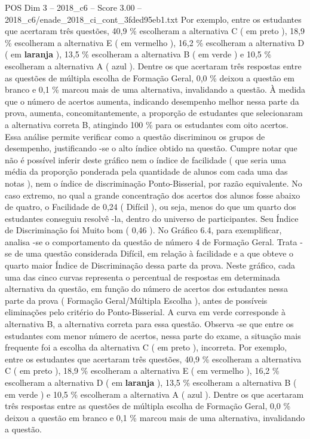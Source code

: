 \begin{textsample}{POS Dim 3 – 2018\_c6 – Score 3.00 – 2018\_c6/enade\_2018\_ci\_cont\_3fded95eb1.txt}
Por exemplo, entre os estudantes que acertaram três questões, 40,9 \% escolheram a alternativa C ( em preto ), 18,9 \% escolheram a alternativa E ( em vermelho ), 16,2 \% escolheram a alternativa D ( em \textbf{laranja} ), 13,5 \% escolheram a alternativa B ( em verde ) e 10,5 \% escolheram a alternativa A ( azul ).
Dentre os que acertaram três respostas entre as questões de múltipla escolha de Formação Geral, 0,0 \% deixou a questão em branco e 0,1 \% marcou mais de uma alternativa, invalidando a questão.
À medida que o número de acertos aumenta, indicando desempenho melhor nessa parte da prova, aumenta, concomitantemente, a proporção de estudantes que selecionaram a alternativa correta B, atingindo 100 \% para os estudantes com oito acertos.
Essa análise permite verificar como a questão discriminou os grupos de desempenho, justificando -se o alto índice obtido na questão.
Cumpre notar que não é possível inferir deste gráfico nem o índice de facilidade ( que seria uma média da proporção ponderada pela quantidade de alunos com cada uma das notas ), nem o índice de discriminação Ponto-Bisserial, por razão equivalente.
No caso extremo, no qual a grande concentração dos acertos dos alunos fosse abaixo de quatro, o Facilidade de 0,24 ( Difícil ), ou seja, menos do que um quarto dos estudantes conseguiu resolvê -la, dentro do universo de participantes.
Seu Índice de Discriminação foi Muito bom ( 0,46 ).
No Gráfico 6.4, para exemplificar, analisa -se o comportamento da questão de número 4 de Formação Geral.
Trata -se de uma questão considerada Difícil, em relação à facilidade e a que obteve o quarto maior Índice de Discriminação dessa parte da prova.
Neste gráfico, cada uma das cinco curvas representa o percentual de respostas em determinada alternativa da questão, em função do número de acertos dos estudantes nessa parte da prova ( Formação Geral/Múltipla Escolha ), antes de possíveis eliminações pelo critério do Ponto-Bisserial.
A curva em verde corresponde à alternativa B, a alternativa correta para essa questão.
Observa -se que entre os estudantes com menor número de acertos, nessa parte do exame, a situação mais frequente foi a escolha da alternativa C ( em preto ), incorreta.
Por exemplo, entre os estudantes que acertaram três questões, 40,9 \% escolheram a alternativa C ( em preto ), 18,9 \% escolheram a alternativa E ( em vermelho ), 16,2 \% escolheram a alternativa D ( em \textbf{laranja} ), 13,5 \% escolheram a alternativa B ( em verde ) e 10,5 \% escolheram a alternativa A ( azul ).
Dentre os que acertaram três respostas entre as questões de múltipla escolha de Formação Geral, 0,0 \% deixou a questão em branco e 0,1 \% marcou mais de uma alternativa, invalidando a questão.

\end{textsample}
